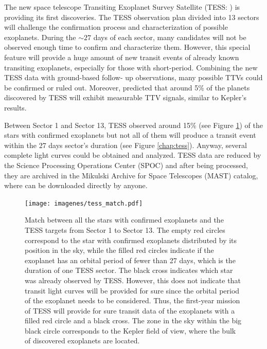 The new space telescope Transiting Exoplanet Survey Satellite (TESS: \cite{Ricker2014}) is providing its first discoveries. The TESS observation plan divided into 13 sectors will challenge the confirmation process and characterization of possible exoplanets. During the $\sim27$ days of each sector, many candidates will not be observed enough time to confirm and characterize them. However, this special feature will provide a huge amount of new transit events of already known transiting exoplanets, especially for those with short-period. Combining the new TESS data with ground-based follow- up observations, many possible TTVs could be confirmed or ruled out. Moreover, \cite{Ballard2018} predicted that around 5\% of the planets discovered by TESS will exhibit measurable TTV signals, similar to Kepler’s results.

Between Sector 1 and Sector 13, TESS observed around 15\% (see Figure \ref{match_tess}) of the stars with confirmed exoplanets but not all of them will produce a transit event within the 27 days sector's duration (see Figure \ref{chap:tess}). Anyway, several complete light curves could be obtained and analyzed. TESS data are reduced by the Science Processing Operations Center (SPOC) and after being processed, they are archived in the Mikulski Archive for Space Telescopes (MAST) catalog, where can be downloaded directly by anyone. 

\begin{figure}
\centering
\texttt{[image: imagenes/tess\_match.pdf]}
\caption{Match between all the stars with confirmed exoplanets and the TESS targets from Sector 1 to Sector 13. The empty red circles correspond to the star with confirmed exoplanets distributed by its position in the sky, while the filled red circles indicate if the exoplanet has an orbital period of fewer than 27 days, which is the duration of one TESS sector. The black cross indicates which star was already observed by TESS. However, this does not indicate that transit light curves will be provided for sure since the orbital period of the exoplanet needs to be considered. Thus, the first-year mission of TESS will provide for sure transit data of the exoplanets with a filled red circle and a black cross. The zone in the sky within the big black circle corresponds to the Kepler field of view, where the bulk of discovered exoplanets are located.}
\label{match_tess}
\end{figure}


